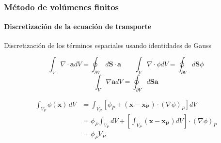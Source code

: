 

\begin{frame}
    \frametitle{M\'etodo de vol\'umenes finitos}
    \framesubtitle{Discretizaci\'on de la ecuaci\'on de transporte}

    Discretizaci\'on de los t\'erminos espaciales usando identidades de Gauss

    $$ \int_V \nabla \cdot \boldsymbol{a} dV = \oint_{\partial V} d\boldsymbol{S} \cdot \boldsymbol{a}    \qquad   \int_V \nabla \cdot \phi dV = \oint_{\partial V} d\boldsymbol{S} \phi$$
    $$ \int_V \nabla \boldsymbol{a} dV = \oint_{\partial V} d\boldsymbol{S} \boldsymbol{a}  $$    
    
    \begin{align*}
      \int_{V_P} \phi (\boldsymbol{x})\,dV & = \int_{V_P} \left [ \phi_P + (\boldsymbol{x} - \boldsymbol{x_P})\cdot (\nabla \phi)_P  \right ] dV \\
                                          & = \phi_P \int_{V_P} dV +  \left [  \int_{V_P} (\boldsymbol{x} - \boldsymbol{x_P}) dV \right ] \cdot (\nabla \phi)_P \\
                                          & = \phi_P V_P
    \end{align*}


                
    
                                                

\end{frame}   










